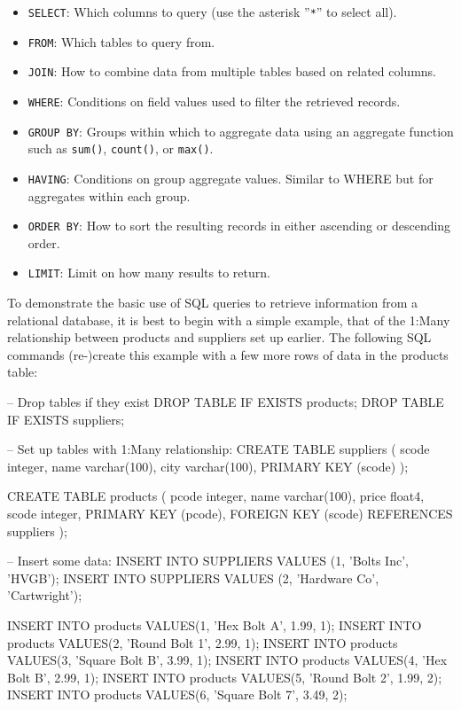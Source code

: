 \begin{samepage}
\begin{itemize}
 \item \texttt{SELECT}: Which columns to query (use the asterisk ''\texttt{*}'' to select all).
 \item \texttt{FROM}: Which tables to query from.
 \item \texttt{JOIN}: How to combine data from multiple tables based on related columns.
 \item \texttt{WHERE}: Conditions on field values used to filter the retrieved records.
 \item \texttt{GROUP BY}: Groups within which to aggregate data using an aggregate function such as \texttt{sum()}, \texttt{count()}, or \texttt{max()}.
 \item \texttt{HAVING}: Conditions on group aggregate values. Similar to WHERE but for aggregates within each group.
 \item \texttt{ORDER BY}: How to sort the resulting records in either ascending or descending order.
 \item \texttt{LIMIT}: Limit on how many results to return.
\end{itemize}
\end{samepage}

To demonstrate the basic use of SQL queries to retrieve information from a relational database, it is best to begin with a simple example, that of the 1:Many relationship between products and suppliers set up earlier. The following SQL commands (re-)create this example with a few more rows of data in the products table:

\begin{samepage}
\begin{sqlcode}
-- Drop tables if they exist
DROP TABLE IF EXISTS products;
DROP TABLE IF EXISTS suppliers;

-- Set up tables with 1:Many relationship:
CREATE TABLE suppliers (
scode integer,
name varchar(100),
city varchar(100),
PRIMARY KEY (scode) );

CREATE TABLE products (
pcode	integer,
name	varchar(100),
price	float4,
scode   integer,
PRIMARY KEY (pcode),
FOREIGN KEY (scode) REFERENCES suppliers );
\end{sqlcode}
\end{samepage}

\begin{samepage}
\begin{sqlcode}
-- Insert some data:
INSERT INTO SUPPLIERS VALUES (1, 'Bolts Inc', 'HVGB');
INSERT INTO SUPPLIERS VALUES (2, 'Hardware Co', 'Cartwright');

INSERT INTO products VALUES(1, 'Hex Bolt A', 1.99, 1);
INSERT INTO products VALUES(2, 'Round Bolt 1', 2.99, 1);
INSERT INTO products VALUES(3, 'Square Bolt B', 3.99, 1);
INSERT INTO products VALUES(4, 'Hex Bolt B', 2.99, 1);
INSERT INTO products VALUES(5, 'Round Bolt 2', 1.99, 2);
INSERT INTO products VALUES(6, 'Square Bolt 7', 3.49, 2);
\end{sqlcode}
\end{samepage}

